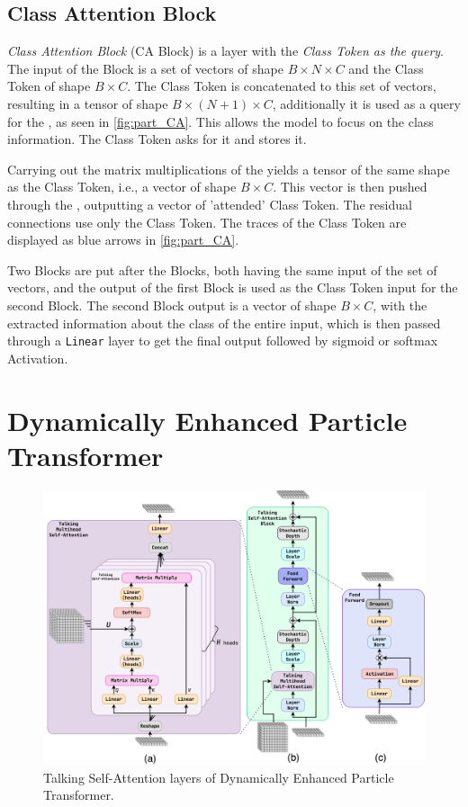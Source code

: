 \subsection{Class Attention Block}
\label{sec:CA}
\emph{Class Attention Block} (CA Block) is a \MHA layer with the \emph{Class Token as the query}.
The input of the \CA Block is a set of vectors of shape $B \times N \times C$ and the Class Token of shape $B \times C$. 
The Class Token is concatenated to this set of vectors, resulting in a tensor of shape $B \times (N+1) \times C$, additionally it is used as a query for the \MHA, as seen in \cref{fig:part_CA}.
This allows the model to focus on the class information. 
The Class Token asks for it and stores it.

Carrying out the matrix multiplications of the \MHA yields a tensor of the same shape as the Class Token, i.e., a vector of shape $B \times C$.
This vector is then pushed through the \FFN, outputting a vector of 'attended' Class Token.
The residual connections use only the Class Token.
The traces of the Class Token are displayed as blue arrows in \cref{fig:part_CA}.

Two \CA Blocks are put after the \SA Blocks, both having the same input of the set of vectors, and the output of the first \CA Block is used as the Class Token input for the second \CA Block.
The second \CA Block output is a vector of shape $B \times C$, with the extracted information about the class of the entire input, which is then passed through a \texttt{Linear} layer to get the final output followed by sigmoid or softmax Activation.



\section{Dynamically Enhanced Particle Transformer}
\label{sec:depart}

\begin{figure}[htb]
    \centering
    \includegraphics[width=1\linewidth]{src/diagrams/depart_layers.png}
    \caption{Talking Self-Attention layers of Dynamically Enhanced Particle Transformer.}
    \label{fig:depart_SA}
\end{figure}



